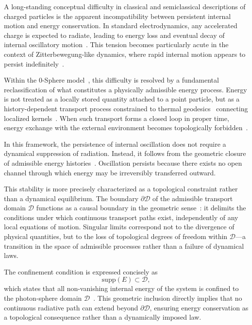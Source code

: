 \documentclass[12pt,a4paper]{article}
\begin{document}
A long-standing conceptual difficulty in classical and semiclassical descriptions of charged particles is the apparent incompatibility between persistent internal motion and energy conservation. In standard electrodynamics, any accelerated charge is expected to radiate, leading to energy loss and eventual decay of internal oscillatory motion~\cite{dirac1938,jackson1999}. This tension becomes particularly acute in the context of Zitterbewegung-like dynamics, where rapid internal motion appears to persist indefinitely~\cite{schrodinger1930,hestenes1990,hanamura17765017,hanamura17765318,hanamura18356895}.

Within the 0-Sphere model~\cite{hanamura16759284}, this difficulty is resolved by a fundamental reclassification of what constitutes a physically admissible energy process. Energy is not treated as a locally stored quantity attached to a point particle, but as a history-dependent transport process constrained to thermal geodesics~\cite{hanamura17765349} connecting localized kernels~\cite{hanamura18067760,hanamura18135855,hanamura18203433}. When such transport forms a closed loop in proper time, energy exchange with the external environment becomes topologically forbidden~\cite{hanamura18275142}.

In this framework, the persistence of internal oscillation does not require a dynamical suppression of radiation. Instead, it follows from the geometric closure of admissible energy histories~\cite{hanamura18275142}. Oscillation persists because there exists no open channel through which energy may be irreversibly transferred outward.

This stability is more precisely characterized as a topological constraint rather than a dynamical equilibrium. The boundary $\partial\mathcal{D}$ of the admissible transport domain $\mathcal{D}$ functions as a causal boundary in the geometric sense~\cite{hanamura18356895}: it delimits the conditions under which continuous transport paths exist, independently of any local equations of motion. Singular limits correspond not to the divergence of physical quantities, but to the loss of topological degrees of freedom within $\mathcal{D}$---a transition in the space of admissible processes rather than a failure of dynamical laws.

The confinement condition is expressed concisely as
\begin{equation}
\mathrm{supp}(E) \subset \mathcal{D},
\label{eq:confinement}
\end{equation}
which states that all non-vanishing internal energy of the system is confined to the photon-sphere domain $\mathcal{D}$~\cite{hanamura18356895}. This geometric inclusion directly implies that no continuous radiative path can extend beyond $\partial\mathcal{D}$, ensuring energy conservation as a topological consequence rather than a dynamically imposed law.
\end{document}
